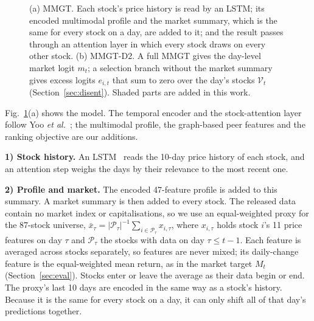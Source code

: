 \documentclass[conference]{IEEEtran}
\begin{document}
\begin{figure}[t]
{}
\caption{(a) MMGT. Each stock's price history is read by an LSTM; its encoded
multimodal profile and the market summary, which is the same for every stock on a
day, are added to it; and the result passes through an attention layer in which
every stock draws on every other stock. (b) MMGT-D2. A full MMGT gives the day-level
market logit $m_t$; a selection branch without the market summary gives excess
logits $e_{i,t}$ that sum to zero over the day's stocks $\mathcal{V}_t$ (Section~\ref{sec:disent}).
Shaded parts are added in this work.}
\label{fig:arch}
\end{figure}

Fig.~\ref{fig:arch}(a) shows the model. The temporal encoder and the stock-attention
layer follow Yoo \textit{et al.}~\cite{yoo2021dtml}; the multimodal profile, the
graph-based peer features and the ranking objective are our additions.

\textbf{1) Stock history.} An LSTM~\cite{hochreiter1997lstm} reads the 10-day price
history of each stock, and an attention step weighs the days by their relevance to
the most recent one.

\textbf{2) Profile and market.} The encoded 47-feature profile is added to this
summary. A market summary is then added to every stock. The released data contain
no market index or capitalisations, so we use an equal-weighted proxy for the
87-stock universe,
$\bar{x}_{\tau}=|\mathcal{P}_{\tau}|^{-1}\sum_{i\in\mathcal{P}_{\tau}}x_{i,\tau}$,
where $x_{i,\tau}$ holds stock $i$'s 11 price features on day $\tau$ and
$\mathcal{P}_{\tau}$ the stocks with data on day $\tau\le t-1$. Each feature is
averaged across stocks separately, so features are never mixed; its daily-change
feature is the equal-weighted mean return, as in the market target $M_t$
(Section~\ref{sec:eval}). Stocks enter or leave the average as their data begin or end.
The proxy's last 10 days are encoded in the same way as a stock's history. Because it
is the same for every stock on a day, it can only shift all of that day's predictions
together.
\end{document}
